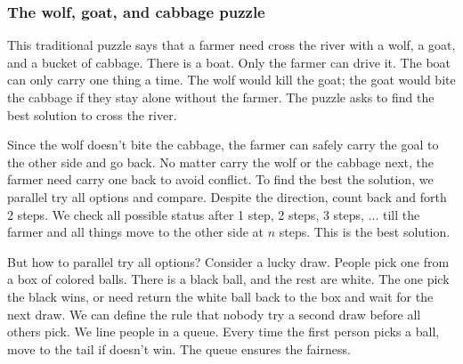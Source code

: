 \documentclass[b5paper]{article}
\begin{document}
\begin{Exercise}\label{ex:leap-frog}
\end{Exercise}

\begin{Answer}[ref = {ex:leap-frog}]
\end{Answer}

\subsubsection{The wolf, goat, and cabbage puzzle}

This traditional puzzle says that a farmer need cross the river with a wolf, a goat, and a bucket of cabbage. There is a boat. Only the farmer can drive it. The boat can only carry one thing a time. The wolf would kill the goat; the goat would bite the cabbage if they stay alone without the farmer. The puzzle asks to find the best solution to cross the river.

Since the wolf doesn't bite the cabbage, the farmer can safely carry the goal to the other side and go back. No matter carry the wolf or the cabbage next, the farmer need carry one back to avoid conflict. To find the best the solution, we parallel try all options and compare. Despite the direction, count back and forth 2 steps. We check all possible status after 1 step, 2 steps, 3 steps, ... till the farmer and all things move to the other side at $n$ steps. This is the best solution.

But how to parallel try all options? Consider a lucky draw. People pick one from a box of colored balls. There is a black ball, and the rest are white. The one pick the black wins, or need return the white ball back to the box and wait for the next draw. We can define the rule that nobody try a second draw before all others pick. We line people in a queue. Every time the first person picks a ball, move to the tail if doesn't win. The queue ensures the fairness.
\end{document}

